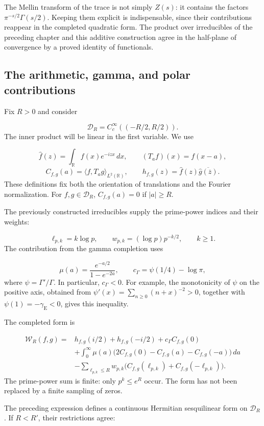 The Mellin transform of the trace is not simply \(Z(s)\): it contains the factors \(\pi^{-s/2}\Gamma(s/2)\). Keeping them explicit is indispensable, since their contributions reappear in the completed quadratic form. The product over irreducibles of the preceding chapter and this additive construction agree in the half-plane of convergence by a proved identity of functionals.

\subsection{The arithmetic, gamma, and polar contributions}
\label{rz:forma}
Fix \(R>0\) and consider

\[
\mathcal D_R=C_c^\infty((-R/2,R/2)).
\]
The inner product will be linear in the first variable. We use

\[
\widehat f(z)=\int_{\mathbb R}f(x)e^{-izx}\,dx,\qquad
(T_af)(x)=f(x-a),
\]
\[
C_{f,g}(a)=\langle f,T_ag\rangle_{L^2(\mathbb R)},\qquad
h_{f,g}(z)=\widehat f(z)\overline{\widehat g(\overline z)}.
\]
These definitions fix both the orientation of translations and the Fourier normalization. For \(f,g\in\mathcal D_R\), \(C_{f,g}(a)=0\) if \(|a|\geq R\).

The previously constructed irreducibles supply the prime-power indices and their weights:

\[
\ell_{p,k}=k\log p,\qquad
w_{p,k}=(\log p)p^{-k/2},\qquad k\geq1.
\]
The contribution from the gamma completion uses

\[
\mu(a)=\frac{e^{-a/2}}{1-e^{-2a}},\qquad
c_\Gamma=\psi(1/4)-\log\pi,
\]
where \(\psi=\Gamma'/\Gamma\). In particular, \(c_\Gamma<0\). For example, the monotonicity of \(\psi\) on the positive axis, obtained from \(\psi'(x)=\sum_{n\geq0}(n+x)^{-2}>0\), together with \(\psi(1)=-\gamma_{\mathrm E}<0\), gives this inequality.

The completed form is

\[
\begin{aligned}
\mathscr W_R(f,g)={}&h_{f,g}(i/2)+h_{f,g}(-i/2)
+c_\Gamma C_{f,g}(0)\\
&+\int_0^\infty\mu(a)
\bigl(2C_{f,g}(0)-C_{f,g}(a)-C_{f,g}(-a)\bigr)\,da\\
&-\sum_{\ell_{p,k}\leq R}w_{p,k}
\bigl(C_{f,g}(\ell_{p,k})+C_{f,g}(-\ell_{p,k})\bigr).
\end{aligned}
\]
The prime-power sum is finite: only \(p^k\leq e^R\) occur. The form has not been replaced by a finite sampling of zeros.

The preceding expression defines a continuous Hermitian sesquilinear form on \(\mathcal D_R\). If \(R<R'\), their restrictions agree:

